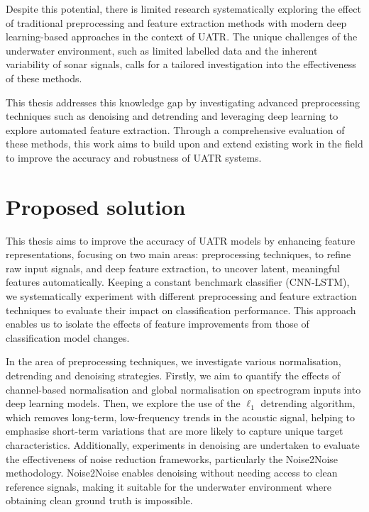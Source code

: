 Despite this potential, there is limited research systematically exploring the effect of traditional preprocessing and feature extraction methods with modern deep learning-based approaches in the context of UATR. The unique challenges of the underwater environment, such as limited labelled data and the inherent variability of sonar signals, calls for a tailored investigation into the effectiveness of these methods.

This thesis addresses this knowledge gap by investigating advanced preprocessing techniques such as denoising and detrending and leveraging deep learning to explore automated feature extraction. Through a comprehensive evaluation of these methods, this work aims to build upon and extend existing work in the field to improve the accuracy and robustness of UATR systems.

\section{Proposed solution}

This thesis aims to improve the accuracy of UATR models by enhancing feature representations, focusing on two main areas: preprocessing techniques, to refine raw input signals, and deep feature extraction, to uncover latent, meaningful features automatically. Keeping a constant benchmark classifier (CNN-LSTM), we systematically experiment with different preprocessing and feature extraction techniques to evaluate their impact on classification performance. This approach enables us to isolate the effects of feature improvements from those of classification model changes.

In the area of preprocessing techniques, we investigate various normalisation, detrending and denoising strategies. Firstly, we aim to quantify the effects of channel-based normalisation and global normalisation on spectrogram inputs into deep learning models. Then, we explore the use of the $\ell_1$ detrending algorithm, which removes long-term, low-frequency trends in the acoustic signal, helping to emphasise short-term variations that are more likely to capture unique target characteristics. Additionally, experiments in denoising are undertaken to evaluate the effectiveness of noise reduction frameworks, particularly the Noise2Noise methodology. Noise2Noise enables denoising without needing access to clean reference signals, making it suitable for the underwater environment where obtaining clean ground truth is impossible.

